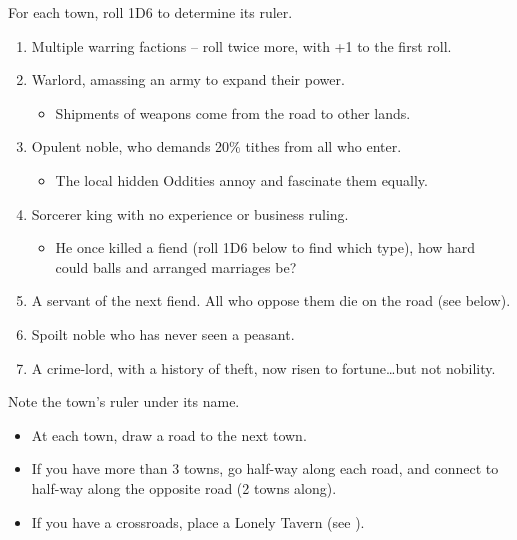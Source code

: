 \begin{multicols}{2}

For each town, roll 1D6 to determine its ruler.

\begin{enumerate}
\item
  Multiple warring factions -- roll twice more, with +1 to the first
  roll.
\item
  Warlord, amassing an army to expand their power.

  \begin{itemize}
  \item
    Shipments of weapons come from the road to other lands.
  \end{itemize}
\item
  Opulent noble, who demands 20\% tithes from all who enter.

  \begin{itemize}
  \item
    The local hidden Oddities annoy and fascinate them equally.
  \end{itemize}
\item
  Sorcerer king with no experience or business ruling.

  \begin{itemize}
  \item
    He once killed a fiend (roll 1D6 below to find which type), how hard
    could balls and arranged marriages be?
  \end{itemize}
\item
  A servant of the next fiend. All who oppose them die on the road (see
  below).
\item
  Spoilt noble who has never seen a peasant.
\item
  A crime-lord, with a history of theft, now risen to fortune\ldots but
  not nobility.
\end{enumerate}

Note the town's ruler under its name.


\begin{itemize}
\item
  At each town, draw a road to the next town.
\item
  If you have more than 3 towns, go half-way along each road, and
  connect to half-way along the opposite road (2 towns along).
\item
  If you have a crossroads, place a Lonely Tavern (see ).
\end{itemize}


\end{multicols}
